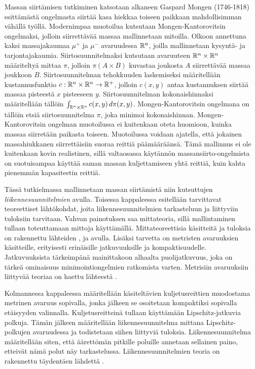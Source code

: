 \documentclass[12pt,oneside,a4paper]{amsbook} %
\begin{document}
Massan siirtämisen tutkiminen katsotaan alkaneen Gaspard Mongen (1746-1818) esittämästä ongelmasta \cite{monge} siirtää kasa hiekkaa toiseen paikkaan mahdollisimman vähällä työllä. Modernimpaa muotoilua kutsutaan Mongen-Kantorovitsin ongelmaksi, jolloin siirrettävää massaa mallinnetaan mitoilla. Olkoon annettuna kaksi massajakaumaa $\mu^+$ ja $\mu^-$ avaruudessa $\mathbb{R}^n$, joilla mallinnetaan kysyntä- ja tarjontajakaumia. Siirtosuunnitelmaksi kutsutaan avaruuteen $\mathbb{R}^n \times \mathbb{R}^n$ määriteltyä mittaa $\pi$, jolloin $\pi(A\times B)$ kuvastaa joukosta $A$ siirrettävää massaa joukkoon $B$. Siirtosuunnitelman tehokkuuden laskemiseksi määritellään kustannusfunktio $c:\mathbb{R}^n\times \mathbb{R}^n \to {\mathbb{R}^{+}}$, jolloin $c(x, y)$ antaa kustannuksen siirtää massaa pisteestä $x$ pisteeseen $y$. Siirtosuunnitelman kokonaishinnaksi määritellään tällöin $\int_{\mathbb{R}^n\times \mathbb{R}^n} c(x, y) \, d\pi(x, y)$. Mongen-Kantorovitsin ongelmana on tällöin etsiä siirtosuunnitelma $\pi$, joka minimoi kokonaishinnan. \cite[s. 11]{optimal} Mongen-Kantorovitsin ongelman muotoilussa ei kuitenkaan oteta huomioon, kuinka massaa siirretään paikasta toiseen. Muotoilussa voidaan ajatella, että jokainen massahiukkanen siirrettäisiin suoraa reittiä päämääräänsä. Tämä mallinnus ei ole kuitenkaan kovin realistinen, sillä valtaosassa käytännön massansiirto-ongelmista on suotuisampaa käyttää saman massan kuljettamiseen yhtä reittiä, kuin kahta pienemmän kapasiteetin reittiä. 

Tässä tutkielmassa mallinnetaan massan siirtämistä niin kutsuttujen \textit{liikennesuunnitelmien} avulla. Toisessa kappaleessa esitellään tarvittavat teoreettiset lähtökohdat, joita liikennesuunnitelmien tarkasteluun ja liittyviin tuloksiin tarvitaan. Vahvan painotuksen saa mittateoria, sillä mallintaminen tullaan toteuttamaan mittoja käyttämällä. Mittateoreettisia käsitteitä ja tuloksia on rakennettu lähteiden \cite{lehrbäck}, \cite{rudin} ja \cite{conway} avulla. Lisäksi tarvetta on metristen avaruuksien käsitteille, erityisesti erinäisille jatkuvuuksille ja kompaktisuudelle. Jatkuvuuksista tärkeimpänä mainittakoon alhaalta puolijatkuvuus, joka on tärkeä ominaisuus minimointiongelmien ratkomista varten. Metrisiin avaruuksiin liittyvää teoriaa on haettu lähteestä \cite{rudin}.

Kolmannessa kappaleessa määritellään käsiteltävien kuljetusreittien muodostama metrinen avaruus sopivalla, jonka jälkeen se osoitetaan kompaktiksi sopivalla etäisyyden valinnalla. Kuljetusreitteinä tullaan käyttämään Lipschitz-jatkuvia polkuja. Tämän jälkeen määritellään liikennesuunnitelma mittana Lipschitz-polkujen avaruudessa ja todistetaan siihen liittyviä tuloksia. Liikennesuunnitelma määritellään siten, että äärettömän pitkille poluille annetaan sellainen paino, etteivät nämä polut näy tarkastelussa. Liikennesuunnitelmien teoria on rakennettu täydentäen lähdettä \cite{optimal}.
\end{document}
